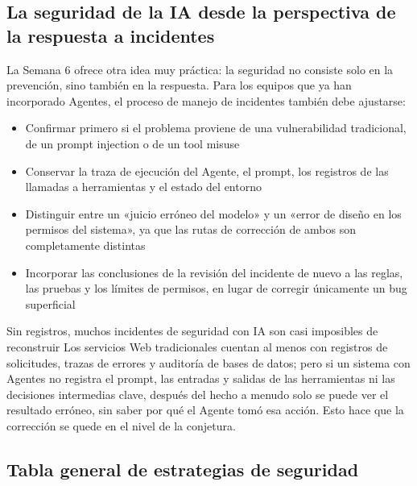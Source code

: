 \subsection{La seguridad de la IA desde la perspectiva de la respuesta a incidentes}

La Semana 6 ofrece otra idea muy práctica: la seguridad no consiste solo en la prevención, sino también en la respuesta. Para los equipos que ya han incorporado Agentes, el proceso de manejo de incidentes también debe ajustarse:

\begin{itemize}
    \item Confirmar primero si el problema proviene de una vulnerabilidad tradicional, de un prompt injection o de un tool misuse
    \item Conservar la traza de ejecución del Agente, el prompt, los registros de las llamadas a herramientas y el estado del entorno
    \item Distinguir entre un «juicio erróneo del modelo» y un «error de diseño en los permisos del sistema», ya que las rutas de corrección de ambos son completamente distintas
    \item Incorporar las conclusiones de la revisión del incidente de nuevo a las reglas, las pruebas y los límites de permisos, en lugar de corregir únicamente un bug superficial
\end{itemize}

\begin{warningbox}{Sin registros, muchos incidentes de seguridad con IA son casi imposibles de reconstruir}
Los servicios Web tradicionales cuentan al menos con registros de solicitudes, trazas de errores y auditoría de bases de datos; pero si un sistema con Agentes no registra el prompt, las entradas y salidas de las herramientas ni las decisiones intermedias clave, después del hecho a menudo solo se puede ver el resultado erróneo, sin saber por qué el Agente tomó esa acción. Esto hace que la corrección se quede en el nivel de la conjetura.
\end{warningbox}

\subsection{Tabla general de estrategias de seguridad}

